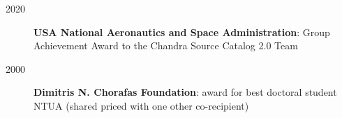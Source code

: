 \documentclass[10pt,a4paper]{article} %
\begin{document}


\begin{description}
\item[2020] \textbf{USA National Aeronautics and Space Administration}: Group Achievement Award to the Chandra Source Catalog 2.0 Team
\item[2000] \textbf{Dimitris N. Chorafas Foundation}: award for best doctoral student NTUA (shared priced with one other co-recipient)
\end{description}


\end{document}
